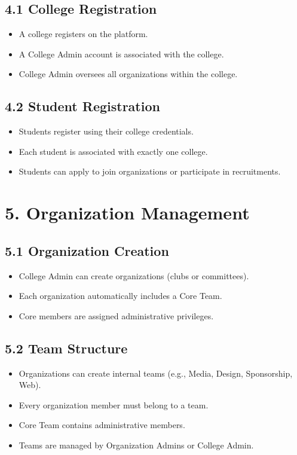 \documentclass[12pt]{article}
\begin{document}
\subsection*{4.1 College Registration}
\begin{itemize}
    \item A college registers on the platform.
    \item A College Admin account is associated with the college.
    \item College Admin oversees all organizations within the college.
\end{itemize}

\subsection*{4.2 Student Registration}
\begin{itemize}
    \item Students register using their college credentials.
    \item Each student is associated with exactly one college.
    \item Students can apply to join organizations or participate in recruitments.
\end{itemize}

\section*{5. Organization Management}

\subsection*{5.1 Organization Creation}
\begin{itemize}
    \item College Admin can create organizations (clubs or committees).
    \item Each organization automatically includes a Core Team.
    \item Core members are assigned administrative privileges.
\end{itemize}

\subsection*{5.2 Team Structure}
\begin{itemize}
    \item Organizations can create internal teams (e.g., Media, Design, Sponsorship, Web).
    \item Every organization member must belong to a team.
    \item Core Team contains administrative members.
    \item Teams are managed by Organization Admins or College Admin.
\end{itemize}
\end{document}
